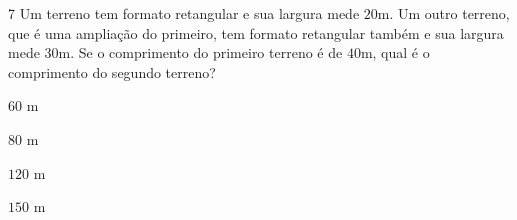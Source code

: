 

\num{7}  Um terreno tem formato retangular e sua largura mede $20$m. Um outro
terreno, que é uma ampliação do primeiro, tem formato retangular também
e sua largura mede $30$m. Se o comprimento do primeiro terreno é de $40$m,
qual é o comprimento do segundo terreno?

\begin{escolha}
\item $60$ m
\item $80$ m
\item $120$ m
\item $150$ m
\end{escolha}



